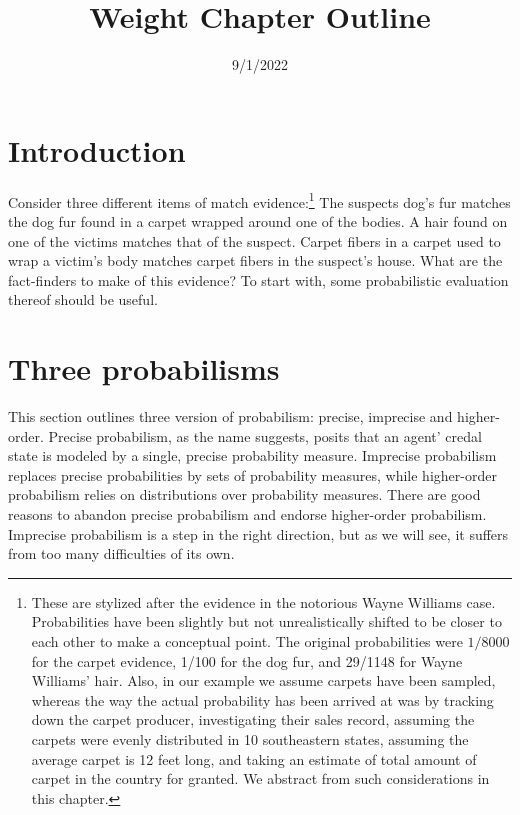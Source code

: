 \documentclass[
  10pt,
  dvipsnames,enabledeprecatedfontcommands]{scrartcl}
\title{Weight Chapter Outline}
\author{}
\date{\vspace{-2.5em}9/1/2022}
\begin{document}
\maketitle

{
\hypersetup{linkcolor=}
\setcounter{tocdepth}{2}
\tableofcontents
}
\hypertarget{introduction}{%
\section{Introduction}\label{introduction}}

Consider three different items of match evidence:\footnote{These are
  stylized after the evidence in the notorious Wayne Williams case.
  Probabilities have been slightly but not unrealistically shifted to be
  closer to each other to make a conceptual point. The original
  probabilities were \(1/8000\) for the carpet evidence, 1/100 for the
  dog fur, and 29/1148 for Wayne Williams' hair. Also, in our example we
  assume carpets have been sampled, whereas the way the actual
  probability has been arrived at was by tracking down the carpet
  producer, investigating their sales record, assuming the carpets were
  evenly distributed in 10 southeastern states, assuming the average
  carpet is 12 feet long, and taking an estimate of total amount of
  carpet in the country for granted. We abstract from such
  considerations in this chapter.} The suspects dog's fur matches the
dog fur found in a carpet wrapped around one of the bodies. A hair found
on one of the victims matches that of the suspect. Carpet fibers in a
carpet used to wrap a victim's body matches carpet fibers in the
suspect's house. What are the fact-finders to make of this evidence? To
start with, some probabilistic evaluation thereof should be useful.

\hypertarget{three-probabilisms}{%
\section{Three probabilisms}\label{three-probabilisms}}

This section outlines three version of probabilism: precise, imprecise
and higher-order. Precise probabilism, as the name suggests, posits that
an agent' credal state is modeled by a single, precise probability
measure. Imprecise probabilism replaces precise probabilities by sets of
probability measures, while higher-order probabilism relies on
distributions over probability measures. There are good reasons to
abandon precise probabilism and endorse higher-order probabilism.
Imprecise probabilism is a step in the right direction, but as we will
see, it suffers from too many difficulties of its own.
\end{document}
